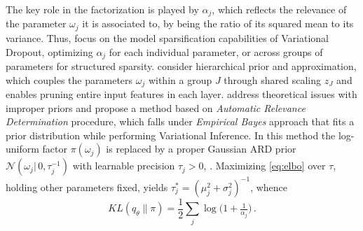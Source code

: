 \documentclass[a4paper,10pt,onecolumn]{article}
\begin{document}
The key role in the factorization is played by $\alpha_j$, which reflects the relevance
of the parameter $\omega_j$ it is associated to, by being the ratio of its squared mean
to its variance. Thus, \citet{molchanov_variational_2017} focus on the model sparsification
capabilities of Variational Dropout, optimizing $\alpha_j$ for each individual parameter,
or across groups of parameters for structured sparsity.
%
\citet{louizos_bayesian_2017} consider hierarchical prior and approximation, which couples
the parameters $\omega_j$ within a group $J$ through shared scaling $z_J$ and enables
pruning entire input features in each layer.
%
\citet{kharitonov_variational_2018}
address theoretical issues with improper priors and propose a method based on \textit{
Automatic Relevance Determination} procedure, which falls under \textit{Empirical Bayes}
approach that fits a prior distribution while performing Variational Inference. In this
method the log-uniform factor $\pi(\omega_j)$ is replaced by a proper Gaussian ARD
prior $
  \mathcal{N}(\omega_j \vert\, 0, \tau^{-1}_j)
$ with learnable precision $\tau_j > 0$, \citep{neal_bayesian_1996}. Maximizing
\eqref{eq:elbo} over $\tau$, holding other parameters fixed, yields $
  \tau^*_j = {(\mu_j^2 + \sigma^2_j)}^{-1}
$, whence
\begin{equation}  \label{eq:ard-kl-div-real}
  KL(q_\theta \| \pi)
    = \frac12 \sum_j \log{\bigl(1 + \tfrac1{\alpha_j} \bigr)}
    \,.
\end{equation}
\end{document}
